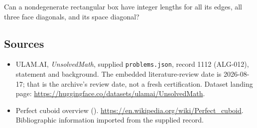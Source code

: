 \documentclass[11pt,a4paper]{article}
\begin{document}
Can a nondegenerate rectangular box have integer lengths for all its edges, all three face diagonals, and its space diagonal?

\subsection{Sources}

{\small

\begin{itemize}

\item[\hypertarget{source:1112:1}{S1}] ULAM.AI, \emph{UnsolvedMath}, supplied \texttt{problems.json}, record 1112 (ALG-012), statement and background. The embedded literature-review date is 2026-08-17; that is the archive’s review date, not a fresh certification. Dataset landing page: \url{https://huggingface.co/datasets/ulamai/UnsolvedMath}.

\item[\hypertarget{source:1112:2}{S2}] Perfect cuboid overview (). \url{https://en.wikipedia.org/wiki/Perfect_cuboid}. Bibliographic information imported from the supplied record.

\end{itemize}

}

\label{end:1112}
\end{document}
